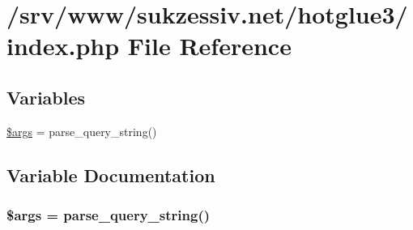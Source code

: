\hypertarget{index_8php}{
\section{/srv/www/sukzessiv.net/hotglue3/index.php File Reference}
\label{index_8php}
}
\subsection*{Variables}
\begin{CompactItemize}
\item 
\hyperlink{index_8php_67e94494731d99ed23b123e95175bc10}{\$args} = parse\_\-query\_\-string()
\end{CompactItemize}


\subsection{Variable Documentation}
\hypertarget{index_8php_67e94494731d99ed23b123e95175bc10}{
\subsubsection[{\$args}]{\setlength{\rightskip}{0pt plus 5cm}\$args = parse\_\-query\_\-string()}}
\label{index_8php_67e94494731d99ed23b123e95175bc10}


